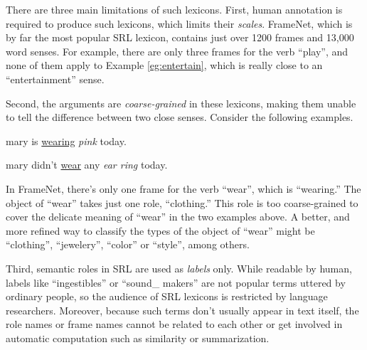 There are three main limitations of such lexicons.
First, human annotation is required to produce such lexicons, which limits
their {\em scales}. FrameNet, which is by far the most popular SRL lexicon,
contains just over 1200 frames and 13,000 word senses.
For example, there are only three frames for the verb ``play'',
and none of them apply to Example \ref{eg:entertain},
which is really close to an ``entertainment'' sense.

Second, the arguments are {\em coarse-grained}
in these lexicons, making them unable to tell the
difference between two close senses. Consider the following examples.
\begin{example}\label{eg:wear1}
mary is \underline{wearing} {\em pink} today.
\end{example}
\begin{example}\label{eg:wear2}
mary didn't \underline{wear} any {\em ear ring} today.
\end{example}
In FrameNet, there's only one frame for the verb ``wear'', which is
``wearing.'' The object of ``wear'' takes just one role, ``clothing.''
This role is too coarse-grained to cover the delicate meaning
of ``wear'' in the two examples above. A better, and more refined way
to classify the types of the object of ``wear'' might be ``clothing'',
``jewelery'', ``color'' or ``style'', among others.

Third, semantic roles in SRL are used as {\em labels} only. While readable
by human, labels like ``ingestibles'' or ``sound\_ makers'' are not
popular terms uttered by ordinary people, so the
audience of SRL lexicons is restricted by language researchers.
Moreover, because such terms don't usually appear in text itself,
the role names or frame names cannot be related to each other
or get involved in automatic computation such as similarity or
summarization.

